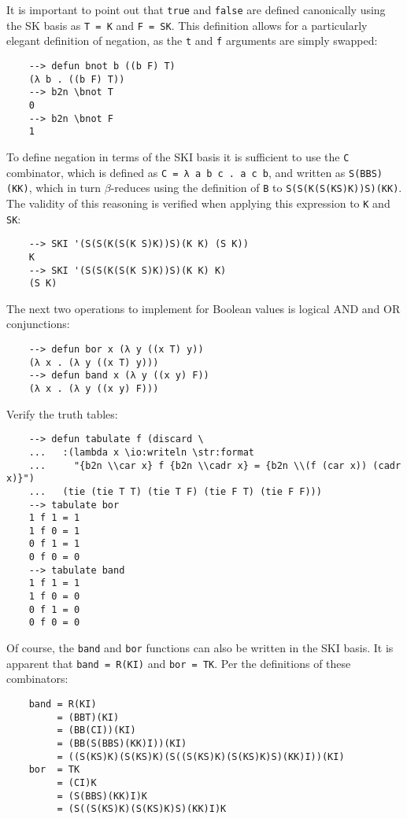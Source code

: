 It is important to point out that \verb|true| and \verb|false| are defined canonically using the SK basis as \verb|T = K| and \verb|F = SK|. This definition allows for a particularly elegant definition of negation, as the \verb|t| and \verb|f| arguments are simply swapped:

\begin{Verbatim}
    --> defun bnot b ((b F) T)
    (λ b . ((b F) T))
    --> b2n \bnot T
    0
    --> b2n \bnot F
    1
\end{Verbatim}

To define negation in terms of the SKI basis it is sufficient to use the \verb|C| combinator, which is defined as \verb|C = λ a b c . a c b|, and written as \verb|S(BBS)(KK)|, which in turn $\beta$-reduces using the definition of \verb|B| to \verb|S(S(K(S(KS)K))S)(KK)|. The validity of this reasoning is verified when applying this expression to \verb|K| and \verb|SK|:

\begin{Verbatim}
    --> SKI '(S(S(K(S(K S)K))S)(K K) (S K))
    K
    --> SKI '(S(S(K(S(K S)K))S)(K K) K)
    (S K)
\end{Verbatim}

The next two operations to implement for Boolean values is logical AND and OR conjunctions:

\begin{Verbatim}
    --> defun bor x (λ y ((x T) y))
    (λ x . (λ y ((x T) y)))
    --> defun band x (λ y ((x y) F))
    (λ x . (λ y ((x y) F)))
\end{Verbatim}

Verify the truth tables:

\begin{Verbatim}
    --> defun tabulate f (discard \
    ...   :(lambda x \io:writeln \str:format
    ...     "{b2n \\car x} f {b2n \\cadr x} = {b2n \\(f (car x)) (cadr x)}")
    ...   (tie (tie T T) (tie T F) (tie F T) (tie F F)))
    --> tabulate bor
    1 f 1 = 1
    1 f 0 = 1
    0 f 1 = 1
    0 f 0 = 0
    --> tabulate band
    1 f 1 = 1
    1 f 0 = 0
    0 f 1 = 0
    0 f 0 = 0
\end{Verbatim}

Of course, the \verb|band| and \verb|bor| functions can also be written in the SKI basis. It is apparent that \verb|band = R(KI)| and \verb|bor = TK|. Per the definitions of these combinators:

\begin{Verbatim}
    band = R(KI)
         = (BBT)(KI)
         = (BB(CI))(KI)
         = (BB(S(BBS)(KK)I))(KI)
         = ((S(KS)K)(S(KS)K)(S((S(KS)K)(S(KS)K)S)(KK)I))(KI)
    bor  = TK
         = (CI)K
         = (S(BBS)(KK)I)K
         = (S((S(KS)K)(S(KS)K)S)(KK)I)K
\end{Verbatim}

